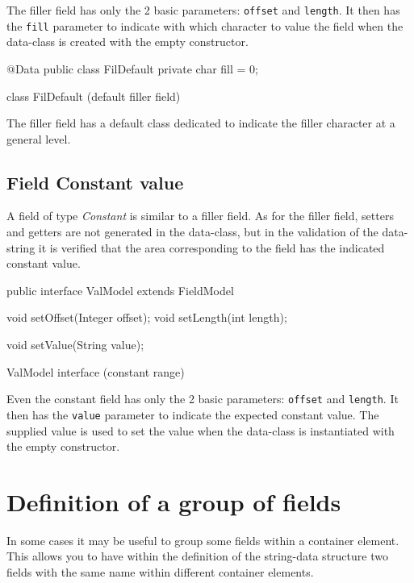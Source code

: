 The filler field has only the 2 basic parameters: \verb!offset! and 
\verb!length!. It then has the \verb!fill! parameter to indicate with which 
character to value the field when the data-class is created with the empty 
constructor.

\begin{elisting}[!htb]
\begin{javacode}
@Data
public class FilDefault {
    private char fill = 0;
}
\end{javacode}
\caption{class FilDefault (default filler field)}
\label{lst:FilDefault}
\end{elisting}

The filler field has a default class dedicated to indicate the filler character 
at a general level.

\section{Field Constant value}
A field of type \textsl{Constant} is similar to a filler field. As for the 
filler field, setters and getters are not generated in the data-class, but in 
the validation of the data-string it is verified that the area corresponding to 
the field has the indicated constant value.

\begin{elisting}[!htb]
\begin{javacode}
public interface ValModel extends FieldModel {
    void setOffset(Integer offset);
    void setLength(int length);
    
    void setValue(String value);
}
\end{javacode}
\caption{ValModel interface (constant range)}
\label{lst:ValModel}
\end{elisting}

Even the constant field has only the 2 basic parameters: \verb!offset! and 
\verb!length!. It then has the \verb!value! parameter to indicate the expected 
constant value. The supplied value is used to set the value when the data-class 
is instantiated with the empty constructor.


\chapter{Definition of a group of fields}
In some cases it may be useful to group some fields within a container element. 
This allows you to have within the definition of the string-data structure two 
fields with the same name within different container elements.

